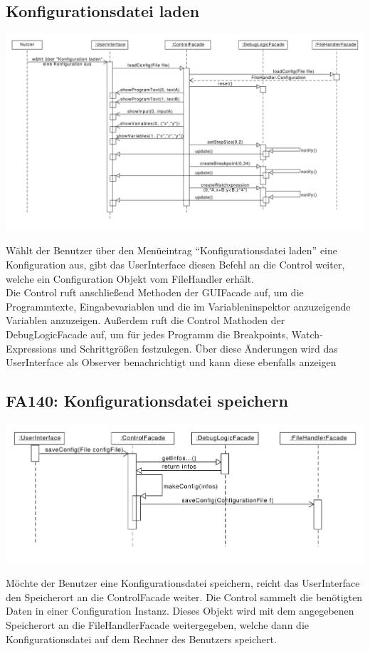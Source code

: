 \documentclass[parskip=full]{scrartcl}
\begin{document}
\subsection{Konfigurationsdatei laden}
\begin{center}
\includegraphics[width=1.0\textwidth]{diagrammIdeenUmlet/SequenceDiagrams/seq_loadConfigPDF.pdf}
\end{center}
Wählt der Benutzer über den Menüeintrag \enquote{Konfigurationsdatei laden} eine Konfiguration aus,
gibt das UserInterface diesen Befehl an die Control weiter, welche ein Configuration Objekt vom FileHandler 
erhält. \\
Die Control ruft anschließend Methoden der GUIFacade auf, um die Programmtexte, Eingabevariablen und
die im Variableninspektor anzuzeigende Variablen anzuzeigen. Außerdem ruft die Control
Mathoden der DebugLogicFacade auf, um für jedes Programm die Breakpoints, Watch-Expressions und
Schrittgrößen festzulegen. Über diese Änderungen wird das UserInterface als Observer benachrichtigt und
kann diese ebenfalls anzeigen

\newpage
\subsection{FA140: Konfigurationsdatei speichern}
\begin{center}
\includegraphics[width=1.0\textwidth]{diagrammIdeenUmlet/SequenceDiagrams/seq_saveConfigPDF.pdf}
\end{center}
Möchte der Benutzer eine Konfigurationsdatei speichern, reicht das UserInterface den Speicherort
an die ControlFacade weiter. Die Control sammelt die benötigten Daten in einer Configuration Instanz.
Dieses Objekt wird mit dem angegebenen Speicherort an die FileHandlerFacade weitergegeben, welche 
dann die Konfigurationsdatei auf dem Rechner des Benutzers speichert.
\end{document}

